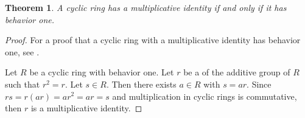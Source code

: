 \documentclass[12pt]{article}
\newtheorem*{thm*}{Theorem}
\begin{document}
\begin{thm*}
A cyclic ring has a multiplicative identity if and only if it has behavior one.
\end{thm*}

\begin{proof}
For a proof that a cyclic ring with a multiplicative identity has behavior one, see .

Let $R$ be a cyclic ring with behavior one.  Let $r$ be a  of the additive group of $R$ such that $r^2=r$.  Let $s \in R$.  Then there exists $a \in R$ with $s=ar$.  Since $rs=r(ar)=ar^2=ar=s$ and multiplication in cyclic rings is commutative, then $r$ is a multiplicative identity.
\end{proof}
\end{document}
